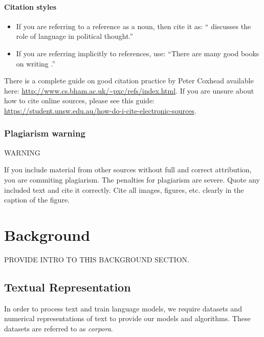 \documentclass{l4proj}
\theoremstyle{definition}
\begin{document}
\subsubsection{Citation styles}

\begin{itemize}
\item If you are referring to a reference as a noun, then cite it as: ``\citet{Orw68} discusses the role of language in political thought.''
\item If you are referring implicitly to references, use: ``There are many good books on writing \citep{Orw68, Wil09, Pin15}.''
\end{itemize}

There is a complete guide on good citation practice by Peter Coxhead available here: \url{http://www.cs.bham.ac.uk/~pxc/refs/index.html}. 
If you are unsure about how to cite online sources, please see this guide: \url{https://student.unsw.edu.au/how-do-i-cite-electronic-sources}.

\subsection{Plagiarism warning}

\begin{highlight_title}{WARNING}
    
    If you include material from other sources without full and correct attribution, you are commiting plagiarism. The penalties for plagiarism are severe.
    Quote any included text and cite it correctly. Cite all images, figures, etc. clearly in the caption of the figure.
\end{highlight_title}


\chapter{Background}
PROVIDE INTRO TO THIS BACKGROUND SECTION. 

\section{Textual Representation}
    In order to process text and train language models, we require datasets and numerical representations of text to provide our models and algorithms. These datasets are referred to as \emph{corpora}.
\end{document}
